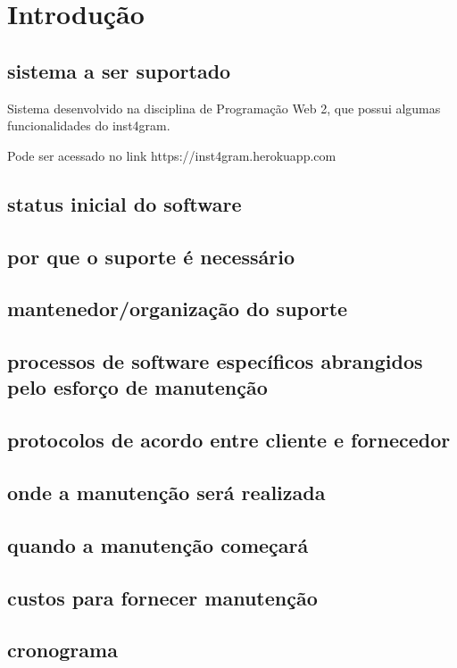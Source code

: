 \chapter{Introdução} 

\section{sistema a ser suportado}

Sistema desenvolvido na disciplina de Programação Web 2, que possui algumas funcionalidades do inst4gram.

Pode ser acessado no link https://inst4gram.herokuapp.com

\section{status inicial do software} 

\section{por que o suporte é necessário} 

\section{mantenedor/organização do suporte} 

\section{processos de software específicos abrangidos pelo esforço de manutenção} 

\section{protocolos de acordo entre cliente e fornecedor}

\section{onde a manutenção será realizada}

\section{quando a manutenção começará}

\section{custos para fornecer manutenção}

\section{cronograma}
